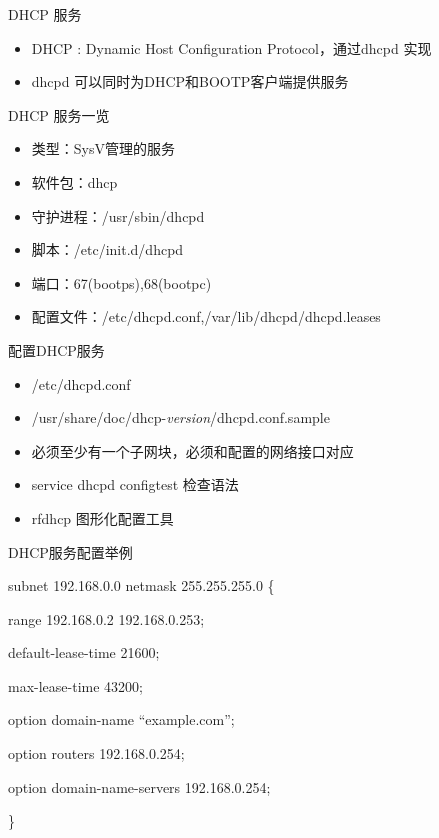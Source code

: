 \begin{frame}{DHCP 服务}
\begin{itemize}
\item DHCP : Dynamic Host Configuration Protocol，通过dhcpd 实现
\item dhcpd 可以同时为DHCP和BOOTP客户端提供服务
\end{itemize}

\end{frame} 
\begin{frame}{DHCP 服务一览}
\begin{itemize}
\item 类型：SysV管理的服务
\item 软件包：dhcp
\item 守护进程：/usr/sbin/dhcpd
\item 脚本：/etc/init.d/dhcpd
\item 端口：67(bootps),68(bootpc)
\item 配置文件：/etc/dhcpd.conf,/var/lib/dhcpd/dhcpd.leases
\end{itemize}

\end{frame} 
\begin{frame}{配置DHCP服务}
\begin{itemize}
\item /etc/dhcpd.conf
\item /usr/share/doc/dhcp-\emph{version}/dhcpd.conf.sample
\item 必须至少有一个子网块，必须和配置的网络接口对应
\item service dhcpd configtest 检查语法
\item rfdhcp 图形化配置工具
\end{itemize}

\end{frame} 
\begin{frame}{DHCP服务配置举例}

subnet 192.168.0.0 netmask 255.255.255.0 \{

	range 192.168.0.2 192.168.0.253;

	default-lease-time 21600;

	max-lease-time 43200;

	option domain-name “example.com”;

	option routers 192.168.0.254;

	option domain-name-servers  192.168.0.254;

\}




\end{frame} 
